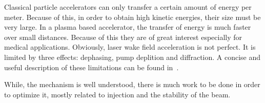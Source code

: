 \documentclass[12pt, class=report, crop=false]{standalone}
\begin{document}
Classical particle accelerators can only transfer a certain amount of energy per meter. Because of this, in order to obtain high kinetic energies, their size must be very large. In a plasma based accelerator, the transfer of energy is much faster over small distances. Because of this they are of great interest especially for medical applications. Obviously, laser wake field acceleration is not perfect. It is limited by three effects: dephasing, pump deplition and diffraction. A concise and useful description of these limitations can be found in~\cite{oneilLaserWakefieldAcceleratior2017}.

While, the mechanism is well understood, there is much work to be done in order to optimize it, mostly related to injection and the stability of the beam.
\end{document}
